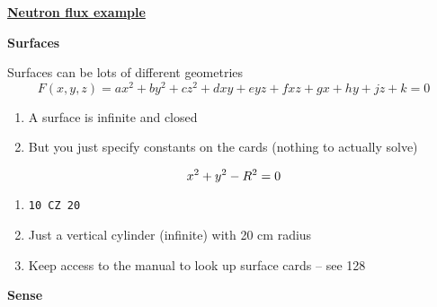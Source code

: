 \documentclass[aspectratio=1610,pdftex,dvipsnames,compress,xcolor={dvipsnames}]{beamer}
\begin{document}
\begin{frame}[plain]{}
    \centering\LARGE\textbf{\href{https://github.com/TheDoctorRAB/mcnpx.decks}{Neutron flux example}}
\end{frame}


\begin{frame}[plain]{}
    \centering\LARGE\textbf{Surfaces}
\end{frame}


\addtocounter{framenumber}{-2} 
\begin{frame}{Surfaces can be lots of different geometries}
    \begin{equation}
        F(x,y,z) = ax^2 + by^2 + cz^2 + dxy + eyz + fxz + gx + hy + jz + k = 0
    \end{equation}

    \vspace*{\fill}

    \begin{enumerate}[series=outerlist,topsep=0pt,itemsep=21pt,leftmargin=*,label=(\arabic*)]
        \item[] A surface is infinite and closed
        \item[] But you just specify constants on the cards (nothing to actually solve)
    \end{enumerate}

    \vspace*{\fill}

    \begin{equation}
        \LARGE
        x^2 + y^2 -R^2 = 0
    \end{equation}

    \vspace*{\fill}

    \begin{enumerate}[series=outerlist,topsep=0pt,itemsep=21pt,leftmargin=*,label=(\arabic*)]
        \item[]\texttt{10     CZ 20}
        \item[] Just a vertical cylinder (infinite) with 20 cm radius
        \item[] Keep access to the manual to look up surface cards -- see 128
    \end{enumerate}
\end{frame}


\begin{frame}[plain]{}
    \centering\LARGE\textbf{Sense}
\end{frame}
\end{document}
